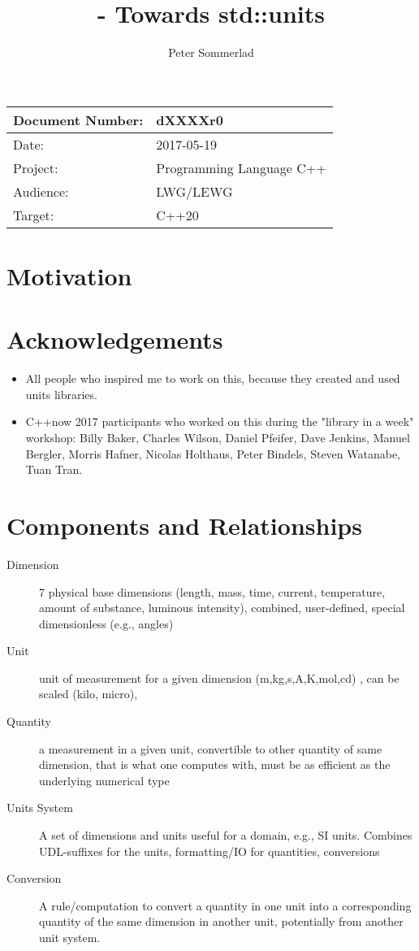 \documentclass[ebook,11pt,article]{memoir}
\title{\papernumber{} - Towards std::units}
\author{Peter Sommerlad}
\date{\paperdate}                        %
\newcommand{\papernumber}{dXXXXr0}
\newcommand{\paperdate}{2017-05-19}
\begin{document}
\maketitle
\begin{tabular}[t]{|l|l|}\hline 
Document Number:& \papernumber  \\\hline
Date: & \paperdate \\\hline
Project: & Programming Language C++\\\hline 
Audience: & LWG/LEWG\\\hline
Target: & C++20\\\hline
\end{tabular}

\chapter{Motivation}

\chapter{Acknowledgements}
\begin{itemize}
\item All people who inspired me to work on this, because they created and used units libraries.
\item C++now 2017 participants who worked on this during the "library in a week" workshop: Billy Baker, Charles Wilson, Daniel Pfeifer, Dave Jenkins, Manuel Bergler, Morris Hafner, Nicolas Holthaus, Peter Bindels, Steven Watanabe, Tuan Tran.
\end{itemize}

\chapter{Components and Relationships}

\begin{description}
\item [Dimension] 7 physical base dimensions (length, mass, time, current, temperature, amount of substance, luminous intensity), combined, user-defined, special dimensionless (e.g., angles)
\item [Unit] unit of measurement for a given dimension (m,kg,s,A,K,mol,cd) , can be scaled (kilo, micro), 
\item [Quantity] a measurement in a given unit, convertible to other quantity of same dimension, that is what one computes with, must be as efficient as the underlying numerical type
\item [Units System] A set of dimensions and units useful for a domain, e.g., SI units. Combines UDL-suffixes for the units, formatting/IO for quantities, conversions
\item [Conversion] A rule/computation to convert a quantity in one unit into a corresponding quantity of the same dimension in another unit, potentially from another unit system.
\end{description}
\end{document}
